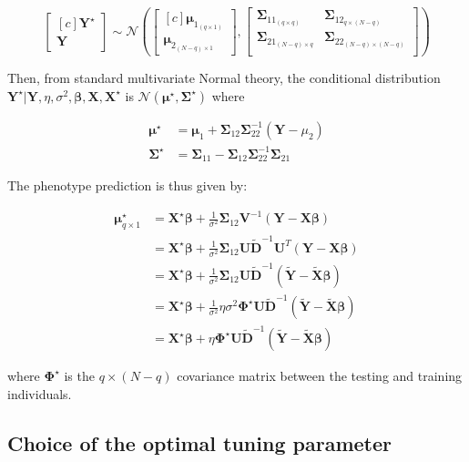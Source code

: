 \documentclass[12pt,letter]{article}\usepackage[]{graphicx}\usepackage[]{color}
\newcommand{\bX}{\textbf{X}}
\newcommand{\bY}{\textbf{Y}}
\newcommand{\bD}{\textbf{D}}
\newcommand{\bXtilde}{\widetilde{\bX}}
\newcommand{\bYtilde}{\widetilde{\bY}}
\newcommand{\bDtilde}{\widetilde{\bD}}
\newcommand{\bU}{\textbf{U}}
\newcommand{\bV}{\textbf{V}}
\newcommand{\bSigma}{\boldsymbol{\Sigma}}
\newcommand{\bmu}{\boldsymbol{\mu}}
\newcommand{\bbeta}{\boldsymbol{\beta}}
\newcommand{\bPhi}{\boldsymbol{\Phi}}
\begin{document}
\begin{equation}
\left[ \begin{matrix*}[c]
\bY^\star \\
\bY
\end{matrix*}\right] \sim \mathcal{N} \left( \left[\begin{matrix*}[c]
\bmu_{1_{(q\times 1)}} \\
\bmu_{2_{(N-q)\times 1}}
\end{matrix*}\right], \left[ \begin{matrix}
\bSigma_{11_{(q\times q)}} & \bSigma_{12_{q\times (N-q)}} \\
\bSigma_{21_{(N-q)\times q}} & \bSigma_{22_{(N-q)\times (N-q)}}  \\
\end{matrix}   \right]  \right)
\end{equation}


Then, from standard multivariate Normal theory, the conditional distribution $\bY^\star | \bY, \eta, \sigma^2, \bbeta,\bX, \bX^\star$ is $\mathcal{N}(\bmu^\star, \bSigma^\star)$ where

\begin{align}
\bmu^\star &= \bmu_1 + \bSigma_{12} \bSigma_{22}^{-1} (\bY - \mu_2) \\
\bSigma^\star & = \bSigma_{11} - \bSigma_{12} \bSigma_{22}^{-1} \bSigma_{21}
\end{align}

The phenotype prediction is thus given by:

\begin{align}
\bmu^\star_{q \times 1} & = \bX^\star \bbeta + \frac{1}{\sigma^2} \bSigma_{12} \bV^{-1} (\bY - \bX \bbeta)\\
& = \bX^\star \bbeta + \frac{1}{\sigma^2} \bSigma_{12} \bU \bDtilde^{-1} \bU^T (\bY - \bX \bbeta)\\
& = \bX^\star \bbeta + \frac{1}{\sigma^2} \bSigma_{12} \bU \bDtilde^{-1} (\bYtilde - \bXtilde \bbeta ) \\
& = \bX^\star \bbeta + \frac{1}{\sigma^2} \eta \sigma^2 \bPhi^\star \bU \bDtilde^{-1} (\bYtilde - \bXtilde \bbeta ) \\
& = \bX^\star \bbeta +  \eta  \bPhi^\star \bU \bDtilde^{-1} (\bYtilde - \bXtilde \bbeta )
\end{align}

where $\bPhi^\star$ is the $q \times (N-q)$ covariance matrix between the testing and training individuals.



\subsection{Choice of the optimal tuning parameter}
\end{document}
